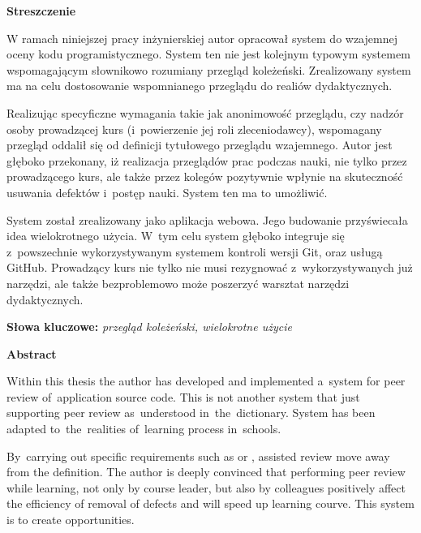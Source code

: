 \begin{center}
\textbf{Streszczenie}
\end{center}

W ramach niniejszej pracy inżynierskiej autor opracował system do wzajemnej oceny kodu programistycznego. System ten nie jest kolejnym typowym systemem wspomagającym słownikowo rozumiany przegląd koleżeński. Zrealizowany system ma na celu dostosowanie wspomnianego przeglądu do realiów dydaktycznych.

Realizując specyficzne wymagania takie jak anonimowość przeglądu, czy nadzór osoby prowadzącej kurs (i~powierzenie jej roli zleceniodawcy), wspomagany przegląd oddalił się od definicji tytułowego przeglądu wzajemnego. Autor jest głęboko przekonany, iż realizacja przeglądów prac podczas nauki, nie tylko przez prowadzącego kurs, ale także przez kolegów pozytywnie wpłynie na skuteczność usuwania defektów i~postęp nauki. System ten ma to umożliwić.

System został zrealizowany jako aplikacja webowa. Jego budowanie przyświecała idea wielokrotnego użycia. W~tym celu system głęboko integruje się z~powszechnie wykorzystywanym systemem kontroli wersji Git, oraz usługą GitHub. Prowadzący kurs nie tylko nie musi rezygnować z~wykorzystywanych już narzędzi, ale także bezproblemowo może poszerzyć warsztat narzędzi dydaktycznych.

\vspace*{\baselineskip}

\noindent\textbf{Słowa kluczowe:} \textit{przegląd koleżeński, wielokrotne użycie}

\vspace*{1.5\baselineskip}

\begin{center}
\textbf{Abstract}
\end{center}

Within this thesis the author has developed and implemented a~system for peer review of~application source code. This is not another system that just supporting peer review as~understood in~the~dictionary. System has been adapted to~the~realities of~learning process in~schools.

By~carrying out specific requirements such as  or , assisted review move away from the definition. The author is deeply convinced that performing peer review while learning, not only by course leader, but also by colleagues positively affect the efficiency of removal of defects and will speed up learning courve. This system is to create opportunities.

